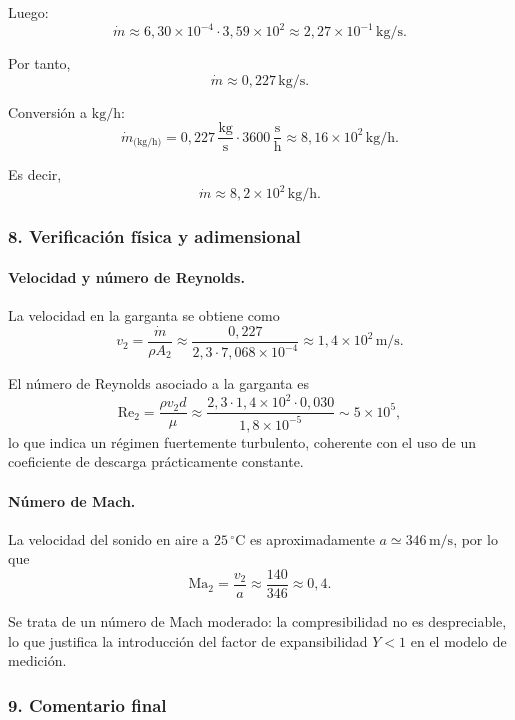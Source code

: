 \documentclass[12pt, a4paper]{article}
\begin{document}
Luego:
\[
\dot m 
\approx 6{,}30\times 10^{-4}\cdot 3{,}59\times 10^2
\approx 2{,}27\times 10^{-1}\,\text{kg/s}.
\]

Por tanto,
\[
\boxed{\dot m \approx 0{,}227\,\text{kg/s}}.
\]

Conversión a $\text{kg/h}$:
\[
\dot m_\text{(kg/h)} 
= 0{,}227\,\frac{\text{kg}}{\text{s}}\cdot 3600\,\frac{\text{s}}{\text{h}}
\approx 8{,}16\times 10^2\,\text{kg/h}.
\]

Es decir,
\[
\boxed{\dot m \approx 8{,}2\times 10^2\,\text{kg/h}}.
\]

\subsubsection*{8. Verificación física y adimensional}

\paragraph{Velocidad y número de Reynolds.}

La velocidad en la garganta se obtiene como
\[
v_2 = \frac{\dot m}{\rho A_2}
    \approx \frac{0{,}227}{2{,}3\cdot 7{,}068\times 10^{-4}}
    \approx 1{,}4\times 10^2\,\text{m/s}.
\]

El número de Reynolds asociado a la garganta es
\[
\text{Re}_2 
= \frac{\rho v_2 d}{\mu}
\approx \frac{2{,}3\cdot 1{,}4\times 10^2\cdot 0{,}030}{1{,}8\times 10^{-5}}
\sim 5\times 10^5,
\]
lo que indica un régimen fuertemente turbulento, coherente con el uso de un 
coeficiente de descarga prácticamente constante.

\paragraph{Número de Mach.}

La velocidad del sonido en aire a $25\,^\circ\text{C}$ es aproximadamente 
$a \simeq 346\,\text{m/s}$, por lo que
\[
\text{Ma}_2 = \frac{v_2}{a}
            \approx \frac{140}{346}
            \approx 0{,}4.
\]

Se trata de un número de Mach moderado: la compresibilidad no es despreciable, lo que 
justifica la introducción del factor de expansibilidad $Y<1$ en el modelo de medición.

\subsubsection*{9. Comentario final}
\end{document}
